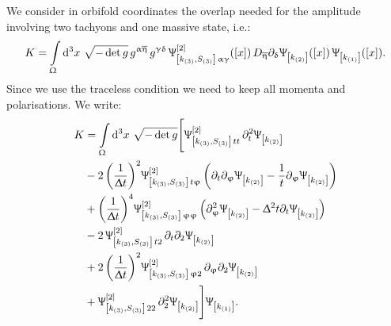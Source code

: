 We consider in orbifold coordinates the overlap needed for the amplitude involving two tachyons and one massive state, i.e.:
\begin{equation}
  K
  =
  \int\limits_{\Upomega} \dd[3]{x}\,
  \sqrt{-\det g}\,
  g^{\upalpha\overline{\upeta}}\, g^{\upgamma\updelta}\,
  \Uppsi^{[2]}_{\qty[k_{\qty(3)}, S_{\qty(3)}]\, \upalpha\upgamma}\qty(\qty[x])\,
  D_{\overline{\upeta}} \partial_{\updelta} \Uppsi_{\qty[k_{\qty(2)}]}\qty(\qty[x])\,
  \Uppsi_{\qty[k_{\qty(1)}]}\qty(\qty[x]).
\end{equation}
Since we use the traceless condition we need to keep all momenta and polarisations.
We write:
\begin{equation}
  \begin{split}
    K
    & =
    \int\limits_{\Omega} \dd[3]{x}\,
    \sqrt{-\det g}
    \Biggl[
      \Psi^{[2]}_{\qty[k_{\qty(3)}, S_{\qty(3)}]\,  t t }\,
      \ipd{t}^2 \Psi_{ \qty[k_{\qty(2)}] }
      \\
      & -
      2\, \qty(\frac{1}{\Delta t})^2
      \Psi^{[2]}_{\qty[k_{\qty(3)}, S_{\qty(3)}]\,  t \varphi }\,
      \qty(%
        \ipd{t} \ipd{\varphi} \Psi_{ \qty[k_{\qty(2)}] }
        -
        \frac{1}{t} \ipd{\varphi} \Psi_{ \qty[k_{\qty(2)}] }
      )
      \\
      & +
      \qty(\frac{1}{\Delta t})^4
      \Psi^{[2]}_{\qty[k_{\qty(3)}, S_{\qty(3)}]\,  \varphi \varphi }\,
      \qty(%
        \ipd{\varphi}^2 \Psi_{ \qty[k_{\qty(2)}] }
        -
        \Delta^2 t \ipd{t} \Psi_{ \qty[k_{\qty(2)}] }
      )
      \\
      & -
      2\, \Psi^{[2]}_{\qty[k_{\qty(3)}, S_{\qty(3)}]\,  t 2 }\,
      \ipd{t} \ipd{2} \Psi_{ \qty[k_{\qty(2)}] }
      \\
      & +
      2\, \qty(\frac{1}{\Delta t})^2
      \Psi^{[2]}_{\qty[k_{\qty(3)}, S_{\qty(3)}]\,  \varphi 2 }\,
      \ipd{\varphi} \ipd{2} \Psi_{ \qty[k_{\qty(2)}] }
      \\
      & +
      \Psi^{[2]}_{\qty[k_{\qty(3)}, S_{\qty(3)}]\,  2 2 }\,
      \ipd{2}^2 \Psi_{ \qty[k_{\qty(2)}] }
    \Biggr]
    \Psi_{ \qty[k_{\qty(1)}] }.
  \end{split}
\end{equation}

